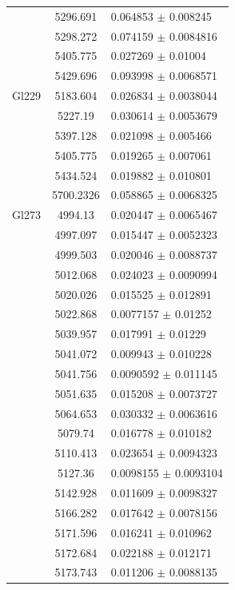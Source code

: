 \begin{longtable}{|c|c|l|}
 & 5296.691 & 0.064853 $\pm$ 0.008245 \\        
 & 5298.272 & 0.074159 $\pm$ 0.0084816 \\       
 & 5405.775 & 0.027269 $\pm$ 0.01004 \\         
 & 5429.696 & 0.093998 $\pm$ 0.0068571 \\       
\hline                                          
Gl229 & 5183.604 & 0.026834 $\pm$ 0.0038044 \\  
 & 5227.19 & 0.030614 $\pm$ 0.0053679 \\        
 & 5397.128 & 0.021098 $\pm$ 0.005466 \\        
 & 5405.775 & 0.019265 $\pm$ 0.007061 \\        
 & 5434.524 & 0.019882 $\pm$ 0.010801 \\        
 & 5700.2326 & 0.058865 $\pm$ 0.0068325 \\      
\hline                                          
Gl273 & 4994.13 & 0.020447 $\pm$ 0.0065467 \\   
 & 4997.097 & 0.015447 $\pm$ 0.0052323 \\       
 & 4999.503 & 0.020046 $\pm$ 0.0088737 \\       
 & 5012.068 & 0.024023 $\pm$ 0.0090994 \\       
 & 5020.026 & 0.015525 $\pm$ 0.012891 \\        
 & 5022.868 & 0.0077157 $\pm$ 0.01252 \\        
 & 5039.957 & 0.017991 $\pm$ 0.01229 \\         
 & 5041.072 & 0.009943 $\pm$ 0.010228 \\        
 & 5041.756 & 0.0090592 $\pm$ 0.011145 \\       
 & 5051.635 & 0.015208 $\pm$ 0.0073727 \\       
 & 5064.653 & 0.030332 $\pm$ 0.0063616 \\       
 & 5079.74 & 0.016778 $\pm$ 0.010182 \\         
 & 5110.413 & 0.023654 $\pm$ 0.0094323 \\       
 & 5127.36 & 0.0098155 $\pm$ 0.0093104 \\       
 & 5142.928 & 0.011609 $\pm$ 0.0098327 \\       
 & 5166.282 & 0.017642 $\pm$ 0.0078156 \\       
 & 5171.596 & 0.016241 $\pm$ 0.010962 \\        
 & 5172.684 & 0.022188 $\pm$ 0.012171 \\        
 & 5173.743 & 0.011206 $\pm$ 0.0088135 \\       

\end{longtable}
